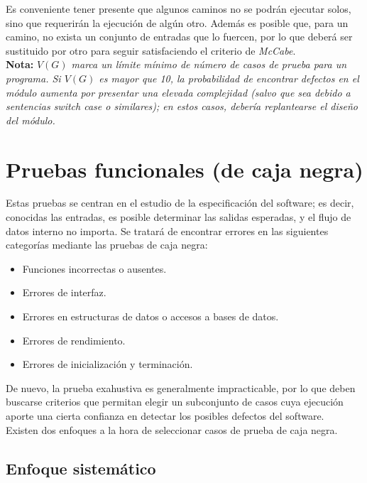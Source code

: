 Es conveniente tener presente que algunos caminos no se podrán ejecutar solos, sino que requerirán la ejecución de algún otro. Además es posible que, para un camino, no exista un conjunto de entradas que lo fuercen, por lo que deberá ser sustituido por otro para seguir satisfaciendo el criterio de \textit{McCabe}.\\

\textbf{Nota:} \textit{$V (G)$ marca un límite mínimo de número de casos de prueba para un programa. Si $V (G)$ es mayor que 10, la probabilidad de encontrar defectos en el módulo aumenta por presentar una elevada complejidad (salvo que sea debido a sentencias \textit{switch case} o similares); en estos casos, debería replantearse el diseño del módulo.}


\section{Pruebas funcionales (de caja negra)}

Estas pruebas se centran en el estudio de la especificación del software; es decir, conocidas las entradas, es posible determinar las salidas esperadas, y el flujo de datos interno no importa. Se tratará de encontrar errores en las siguientes categorías mediante las pruebas de caja negra:

\begin{itemize}
    \item Funciones incorrectas o ausentes.
    \item Errores de interfaz.
    \item Errores en estructuras de datos o accesos a bases de datos.
    \item Errores de rendimiento.
    \item Errores de inicialización y terminación.
\end{itemize}

De nuevo, la prueba exahustiva es generalmente impracticable, por lo que deben buscarse criterios que permitan elegir un subconjunto de casos cuya ejecución aporte una cierta confianza en detectar los posibles defectos del software.\\

Existen dos enfoques a la hora de seleccionar casos de prueba de caja negra.

\subsection{Enfoque sistemático}

